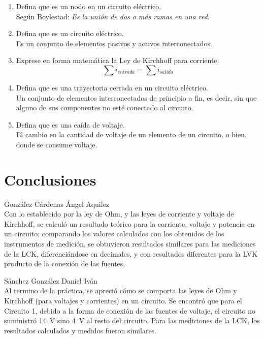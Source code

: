 \documentclass[a4paper,12pt]{article}
\begin{document}
\begin{enumerate}

\item Defina que es un nodo en un circuito eléctrico.\\
Según Boylestad: \textit{Es la unión de dos o más ramas en una red}.
\item Defina que es un circuito eléctrico.\\
Es un conjunto de elementos pasivos y activos interconectados.
\item Exprese en forma matemática la Ley de Kirchhoff para corriente.\\
\[\sum i_{entrada} = \sum i_{salida}\]
\item Defina que es una trayectoria cerrada en un circuito eléctrico.\\
Un conjunto de elementos interconectados de principio a fin, es decir, sin que alguno de sus componentes no esté conectado al circuito.

\item Defina que es una caída de voltaje.\\
El cambio en la cantidad de voltaje de un elemento de un circuito, o bien, donde se consume voltaje.


\end{enumerate}


\newpage

\section{Conclusiones}

\vspace{.5cm}

{\Large González Cárdenas Ángel Aquilez}\\
\vspace{.3cm}
Con lo establecido por la ley de Ohm, y las leyes de corriente y voltaje de Kirchhoff, se calculó un resultado teórico para la corriente, voltaje y potencia en un circuito; comparando los valores calculados con los obtenidos de los instrumentos de  medición, se obtuvieron resultados similares para las mediciones de la LCK, diferenciándose en decimales, y con resultados diferentes para la LVK producto de la conexión de las fuentes.\par

\vspace{1cm}

{\Large Sánchez González Daniel Iván}\\
\vspace{.3cm}
Al termino de la práctica, se apreció cómo se comporta las leyes de Ohm y Kirchhoff (para voltajes y corrientes) en un circuito. Se encontró que para el Circuito 1, debido a la forma de conexión de las fuentes de voltaje, el circuito no suministró \SI{14}{\volt} sino \SI{4}{\volt} al resto del circuito. Para las mediciones de la LCK, los resultados calculados y medidos fueron similares.
\par
\end{document}
